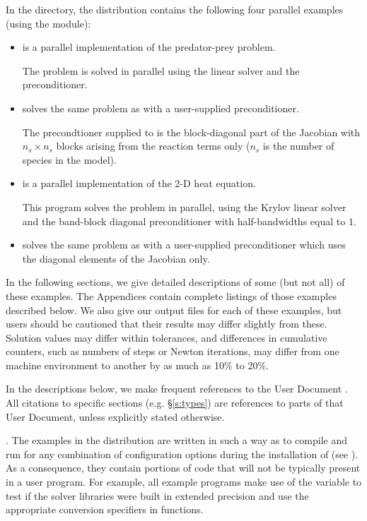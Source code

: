 In the  directory, the {\ida} 
distribution contains the following four parallel examples 
(using the {\nvecp} module):
\begin{itemize}

\item {}
  is a parallel implementation of the predator-prey problem.

  The problem is solved in parallel using the {\idaspgmr} linear
  solver and the {\idabbdpre} preconditioner.

\item {}
  solves the same problem as  with a user-supplied preconditioner.
  
  The precondtioner supplied to {\idaspgmr} is the block-diagonal part of 
  the Jacobian with $n_s \times n_s$ blocks arising from the reaction terms only
  ($n_s$ is the number of species in the model).

\item {}
  is a parallel implementation of the 2-D heat equation.

  This program solves the problem in parallel, using the Krylov linear solver
  {\idaspgmr} and the band-block diagonal preconditioner {\idabbdpre} with
  half-bandwidths equal to $1$.

\item {}
  solves the same problem as  with a user-supplied preconditioner
  which uses the diagonal elements of the Jacobian only.
  
\end{itemize}

\vspace{0.2in}\noindent 
In the following sections, we give detailed descriptions of some (but
not all) of these examples.  The Appendices contain complete listings
of those examples described below.  We also give our output files for
each of these examples, but users should be cautioned that their
results may differ slightly from these.  Solution
values may differ within tolerances, and differences in cumulative
counters, such as numbers of steps or Newton iterations, may differ
from one machine environment to another by as much as 10\% to 20\%.

In the descriptions below, we make frequent references to the {\ida}
User Document \cite{ida2.2.0_ug}.  All citations to specific sections
(e.g. \S\ref{s:types}) are references to parts of that User Document, unless
explicitly stated otherwise.

\vspace{0.2in}. 
The examples in the {\ida} distribution are written in such a way as
to compile and run for any combination of configuration options during
the installation of {\sundials} (see ). As a consequence,
they contain portions of code that will not be typically present in a
user program. For example, all example programs make use of the
variable  to test if the solver libraries
were built in extended precision and use the appropriate conversion 
specifiers in  functions.